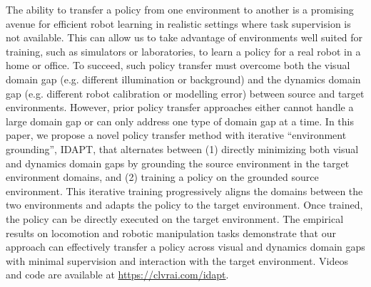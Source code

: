 The ability to transfer a policy from one environment to another is a promising avenue for efficient robot learning in realistic settings where task supervision is not available. This can allow us to take advantage of environments well suited for training, such as simulators or laboratories, to learn a policy for a real robot in a home or office. To succeed, such policy transfer must overcome both the visual domain gap (e.g. different illumination or background) and the dynamics domain gap (e.g. different robot calibration or modelling error) between source and target environments. However, prior policy transfer approaches either cannot handle a large domain gap or can only address one type of domain gap at a time. In this paper, we propose a novel policy transfer method with iterative ``environment grounding'', IDAPT, that alternates between (1) directly minimizing both visual and dynamics domain gaps by grounding the source environment in the target environment domains, and (2) training a policy on the grounded source environment. This iterative training progressively aligns the domains between the two environments and adapts the policy to the target environment. Once trained, the policy can be directly executed on the target environment. The empirical results on locomotion and robotic manipulation tasks demonstrate that our approach can effectively transfer a policy across visual and dynamics domain gaps with minimal supervision and interaction with the target environment. Videos and code are available at \url{https://clvrai.com/idapt}.
